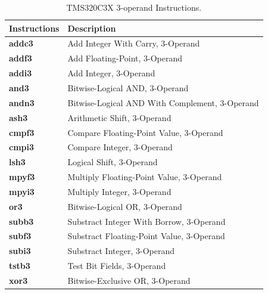 \begin{table}[!p]
\begin{center}
	\small
	\begin{tabular}{|p{3.0cm}|p{10.0cm}|}
	\hline
	\textbf{Instructions} & \textbf{Description}\\
	\hline
	\textbf{addc3} & Add Integer With Carry, 3-Operand\\
	\hline
	\textbf{addf3} & Add Floating-Point, 3-Operand\\
	\hline
	\textbf{addi3} & Add Integer, 3-Operand\\
	\hline
	\textbf{and3} & Bitwise-Logical AND, 3-Operand\\
	\hline
	\textbf{andn3} & Bitwise-Logical AND With Complement, 3-Operand\\
	\hline
	\textbf{ash3} & Arithmetic Shift, 3-Operand\\
	\hline
	\textbf{cmpf3} & Compare Floating-Point Value, 3-Operand\\
	\hline
	\textbf{cmpi3} & Compare Integer, 3-Operand\\
	\hline
	\textbf{lsh3} & Logical Shift, 3-Operand\\
	\hline
	\textbf{mpyf3} & Multiply Floating-Point Value, 3-Operand\\
	\hline
	\textbf{mpyi3} & Multiply Integer, 3-Operand\\
	\hline
	\textbf{or3} & Bitwise-Logical OR, 3-Operand\\
	\hline
	\textbf{subb3} & Substract Integer With Borrow, 3-Operand\\
	\hline
	\textbf{subf3} & Substract Floating-Point Value, 3-Operand\\
	\hline
	\textbf{subi3} & Substract Integer, 3-Operand\\
	\hline
	\textbf{tstb3} & Test Bit Fields, 3-Operand\\
	\hline
	\textbf{xor3} & Bitwise-Exclusive OR, 3-Operand\\
	\hline
	\end{tabular}
	\caption{\label{table:tms320c3x_3ops_instructions} TMS320C3X 3-operand Instructions.}
\end{center}
\end{table}

